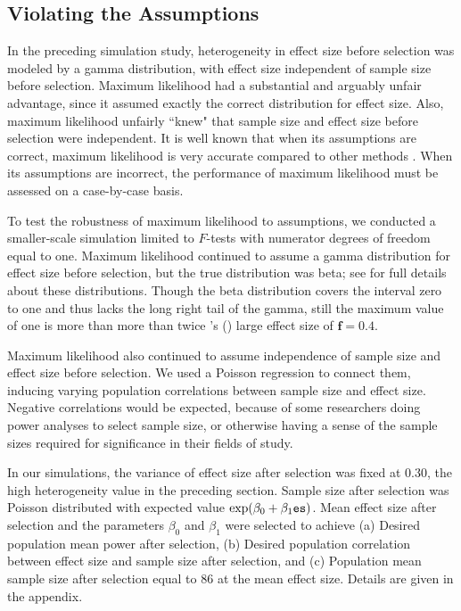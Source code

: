 \documentclass[jou]{apa6} %
\newcommand{\R}[1]{\mbox{\texttt{#1}}} %
\begin{document}
\subsection{Violating the Assumptions} \label{VIOLATION}

In the preceding simulation study, heterogeneity in effect size before selection was modeled by a gamma distribution, with effect size independent of sample size before selection. Maximum likelihood had a substantial and arguably unfair advantage, since it assumed exactly the correct distribution for effect size. Also, maximum likelihood unfairly ``knew" that sample size and effect size before selection were independent. It is well known that when its assumptions are correct, maximum likelihood is very accurate compared to other methods \parencite[][Ch.~18]{StuartOrd1999}. When its assumptions are incorrect, the performance of maximum likelihood must be assessed on a case-by-case basis.

To test the robustness of maximum likelihood to assumptions, we conducted a smaller-scale simulation limited to $F$-tests with numerator degrees of freedom equal to one. Maximum likelihood continued to assume a gamma distribution for effect size before selection, but the true distribution was beta; see \textcite{JohnsonEtAl1995} for full details about these distributions. Though the beta distribution covers the interval zero to one and thus lacks the long right tail of the gamma, still the maximum value of one is more than more than twice 
\citeauthor{Cohen1988}'s (\citeyear[][p.~287]{Cohen1988})
large effect size of $\mathbf{f}=0.4$. 

Maximum likelihood also continued to assume independence of sample size and effect size before selection. We used a Poisson regression to connect them, inducing varying population correlations between sample size and effect size. Negative correlations would be expected, because of some researchers doing power analyses to select sample size,  or otherwise having a sense of the sample sizes required for significance in their fields of study.

In our simulations, the variance of effect size after selection was fixed at 0.30, the high heterogeneity value in the preceding section. Sample size after selection was Poisson distributed with expected value $\exp(\beta_0+\beta_1\R{es})$. Mean effect size after selection and the parameters $\beta_0$ and $\beta_1$ were selected to achieve (a) Desired population mean power after selection, (b) Desired population correlation between effect size and sample size after selection, and (c) Population mean sample size after selection equal to 86 at the mean effect size. Details are given in the appendix.
\end{document}
